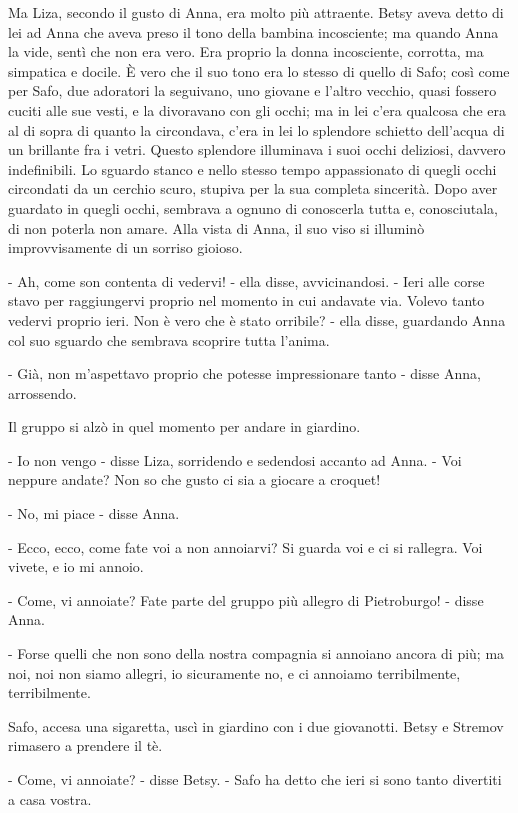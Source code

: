 Ma Liza, secondo il gusto di Anna, era molto più attraente. Betsy aveva detto di lei ad Anna che aveva preso il tono della bambina incosciente; ma quando Anna la vide, sentì che non era vero. Era proprio la donna incosciente, corrotta, ma simpatica e docile. È vero che il suo tono era lo stesso di quello di Safo; così come per Safo, due adoratori la seguivano, uno giovane e l'altro vecchio, quasi fossero cuciti alle sue vesti, e la divoravano con gli occhi; ma in lei c'era qualcosa che era al di sopra di quanto la circondava, c'era in lei lo splendore schietto dell'acqua di un brillante fra i vetri. Questo splendore illuminava i suoi occhi deliziosi, davvero indefinibili. Lo sguardo stanco e nello stesso tempo appassionato di quegli occhi circondati da un cerchio scuro, stupiva per la sua completa sincerità. Dopo aver guardato in quegli occhi, sembrava a ognuno di conoscerla tutta e, conosciutala, di non poterla non amare. Alla vista di Anna, il suo viso si illuminò improvvisamente di un sorriso gioioso. 

- Ah, come son contenta di vedervi! - ella disse, avvicinandosi. - Ieri alle corse stavo per raggiungervi proprio nel momento in cui andavate via. Volevo tanto vedervi proprio ieri. Non è vero che è stato orribile? - ella disse, guardando Anna col suo sguardo che sembrava scoprire tutta l'anima. 

- Già, non m'aspettavo proprio che potesse impressionare tanto - disse Anna, arrossendo. 

Il gruppo si alzò in quel momento per andare in giardino. 

- Io non vengo - disse Liza, sorridendo e sedendosi accanto ad Anna. - Voi neppure andate? Non so che gusto ci sia a giocare a croquet! 

- No, mi piace - disse Anna. 

- Ecco, ecco, come fate voi a non annoiarvi? Si guarda voi e ci si rallegra. Voi vivete, e io mi annoio. 

- Come, vi annoiate? Fate parte del gruppo più allegro di Pietroburgo! - disse Anna. 

- Forse quelli che non sono della nostra compagnia si annoiano ancora di più; ma noi, noi non siamo allegri, io sicuramente no, e ci annoiamo terribilmente, terribilmente. 

Safo, accesa una sigaretta, uscì in giardino con i due giovanotti. Betsy e Stremov rimasero a prendere il tè. 

- Come, vi annoiate? - disse Betsy. - Safo ha detto che ieri si sono tanto divertiti a casa vostra. 

